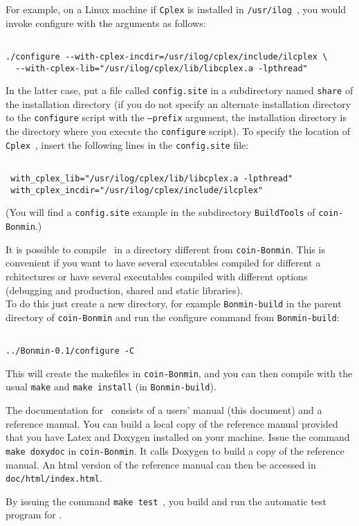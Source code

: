 For example, on a Linux machine if {\tt Cplex} is installed in {\tt /usr/ilog}~, you would
invoke configure with the arguments as follows:
\begin{verbatim}

./configure --with-cplex-incdir=/usr/ilog/cplex/include/ilcplex \
  --with-cplex-lib="/usr/ilog/cplex/lib/libcplex.a -lpthread"
 \end{verbatim}
In the latter case, put a file called {\tt config.site} in a subdirectory named
{\tt share} of the installation directory (if you do not specify an alternate
installation directory to the {\tt configure} script with the {\tt --prefix}
argument, the installation directory is the directory where you execute the
{\tt configure} script). To specify the location of {\tt Cplex}~, insert the
following lines in the {\tt config.site} file:
 \begin{verbatim}

 with_cplex_lib="/usr/ilog/cplex/lib/libcplex.a -lpthread"
 with_cplex_incdir="/usr/ilog/cplex/include/ilcplex"
 \end{verbatim}
 (You will find a {\tt config.site} example in the subdirectory {\tt BuildTools} of {\tt coin-Bonmin}.)

It is possible to compile \Bonmin\ in a directory different from {\tt coin-Bonmin}.
This is convenient if you want to have several executables compiled for different a
rchitectures or have several executables compiled with different options
(debugging and production, shared and static libraries).\\

To do this just create a new directory, for example {\tt Bonmin-build} in the parent directory of
{\tt coin-Bonmin} and run the configure command from {\tt Bonmin-build}:
\begin{verbatim}

../Bonmin-0.1/configure -C

\end{verbatim}
This will create the makefiles in {\tt coin-Bonmin}, and
you can then compile with the usual {\tt make} and {\tt make install}
(in {\tt Bonmin-build}).

The documentation for \Bonmin\ consists of a users' manual (this document) and a reference manual.
You can build a local copy of the reference manual provided that you have Latex
and Doxygen installed on your machine. Issue the command {\tt make
doxydoc} in {\tt coin-Bonmin}. It calls Doxygen to build a copy of the
reference manual. An html version of the reference manual can then
be accessed in {\tt doc/html/index.html}.


By issuing the command {\tt make test}~, you build and run the automatic test program for \Bonmin.
